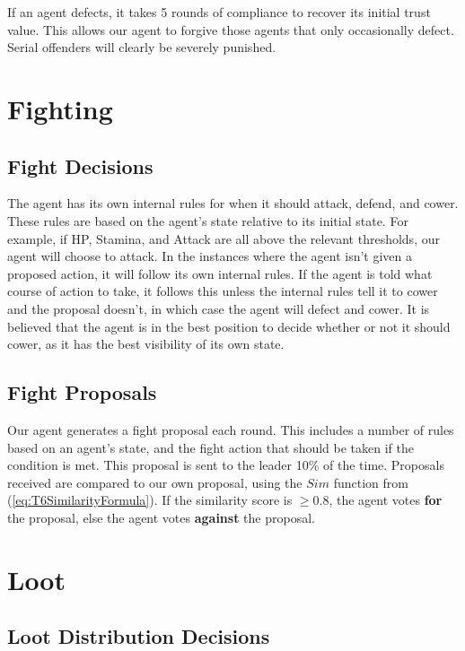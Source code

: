 If an agent defects, it takes 5 rounds of compliance to recover its initial trust value. This allows our agent to forgive those agents that only occasionally defect. Serial offenders will clearly be severely punished.

\section{Fighting}

\subsection{Fight Decisions}

The agent has its own internal rules for when it should attack, defend, and cower. These rules are based on the agent's state relative to its initial state. For example, if HP, Stamina, and Attack are all above the relevant thresholds, our agent will choose to attack. In the instances where the agent isn't given a proposed action, it will follow its own internal rules. If the agent is told what course of action to take, it follows this unless the internal rules tell it to cower and the proposal doesn't, in which case the agent will defect and cower. It is believed that the agent is in the best position to decide whether or not it should cower, as it has the best visibility of its own state.

\subsection{Fight Proposals}\label{T6FightProposals}

Our agent generates a fight proposal each round. This includes a number of rules based on an agent's state, and the fight action that should be taken if the condition is met. This proposal is sent to the leader 10\% of the time. Proposals received are compared to our own proposal, using the $Sim$ function from (\ref{eq:T6SimilarityFormula}). If the similarity score is $\geq 0.8$, the agent votes \textbf{for} the proposal, else the agent votes \textbf{against} the proposal.

\section{Loot}

\subsection{Loot Distribution Decisions}

